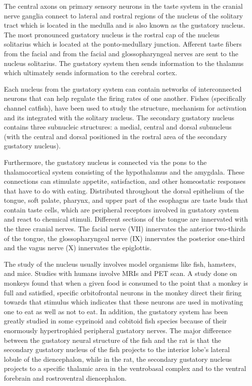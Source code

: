The central axons on primary sensory neurons in the taste system in the cranial nerve ganglia connect to lateral and rostral regions of the nucleus of the solitary tract which is located in the medulla and is also known as the gustatory nucleus. The most pronounced gustatory nucleus is the rostral cap of the nucleus solitarius which is located at the ponto-medullary junction. Afferent taste fibers from the facial and from the facial and glossopharyngeal nerves are sent to the nucleus solitarius. The gustatory system then sends information to the thalamus which ultimately sends information to the cerebral cortex.

Each nucleus from the gustatory system can contain networks of interconnected neurons that can help regulate the firing rates of one another. Fishes (specifically channel catfish), have been used to study the structure, mechanism for activation and its integrated with the solitary nucleus. The secondary gustatory nucleus contains three subnucleic structures: a medial, central and dorsal subnucleus (with the central and dorsal positioned in the rostral area of the secondary gustatory nucleus).

Furthermore, the gustatory nucleus is connected via the pons to the thalamocortical system consisting of the hypothalamus and the amygdala. These connections can stimulate appetite, satisfaction, and other homeostatic responses that have to do with eating. Distributed throughout the dorsal epithelium of the tongue, soft palate, pharynx, and upper part of the esophagus are taste buds that contain taste cells, which are peripheral receptors involved in gustatory system and react to chemical stimuli. Different sections of the tongue are innervated with the three cranial nerves. The facial nerve (VII) innervates the anterior two-thirds of the tongue, the glossopharyngeal nerve (IX) innervates the posterior one-third and the vagus nerve (X) innervates the epiglottis.

The study of the nucleus usually involves model organisms like fish, hamsters, and mice. Studies with humans involve MRIs and PET scan. A study done on monkeys found that when a given food is consumed to the point that a monkey is full and satisfied, specific orbitofrontal neurons in the monkey direct their firing towards that stimulus which indicates that these neurons are used in motivating one to eat as well as not to eat. In addition, the gustatory system has been greatly studied in some cyprinoid and cobitoid fish species because of their enormously hypertrophied peripheral gustatory nerves. The major difference between the gustatory neural structure of the fish and the rat is that the secondary gustatory nucleus of the fish projects to the interior lobe's lateral lobule of the diencephalon, while in the rat, the secondary gustatory nucleus projects to a specific thalamic area in the ventrobasal complex and to the ventral forebrain and rostroventral diencephalon.

